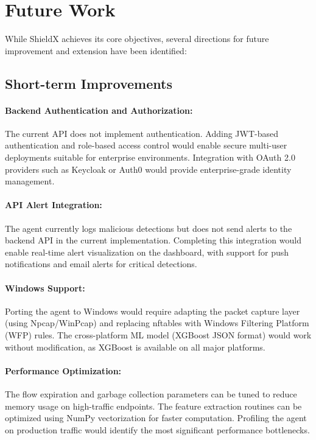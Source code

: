 \documentclass[../Main.tex]{subfiles}
\begin{document}
\section{Future Work}

While ShieldX achieves its core objectives, several directions for future improvement and extension have been identified:

\subsection{Short-term Improvements}

\paragraph{Backend Authentication and Authorization:} The current API does not implement authentication. Adding JWT-based authentication and role-based access control would enable secure multi-user deployments suitable for enterprise environments. Integration with OAuth 2.0 providers such as Keycloak or Auth0 would provide enterprise-grade identity management.

\paragraph{API Alert Integration:} The agent currently logs malicious detections but does not send alerts to the backend API in the current implementation. Completing this integration would enable real-time alert visualization on the dashboard, with support for push notifications and email alerts for critical detections.

\paragraph{Windows Support:} Porting the agent to Windows would require adapting the packet capture layer (using Npcap/WinPcap) and replacing nftables with Windows Filtering Platform (WFP) rules. The cross-platform ML model (XGBoost JSON format) would work without modification, as XGBoost is available on all major platforms.

\paragraph{Performance Optimization:} The flow expiration and garbage collection parameters can be tuned to reduce memory usage on high-traffic endpoints. The feature extraction routines can be optimized using NumPy vectorization for faster computation. Profiling the agent on production traffic would identify the most significant performance bottlenecks.
\end{document}
